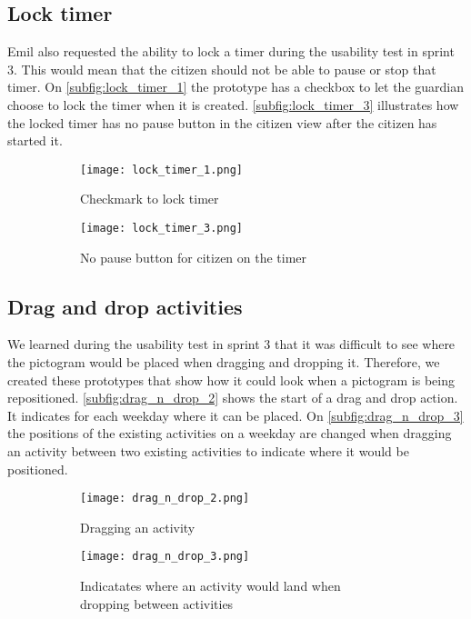 \subsection{Lock timer}
Emil also requested the ability to lock a timer during the usability test in sprint 3. 
This would mean that the citizen should not be able to pause or stop that timer.
On \autoref{subfig:lock_timer_1} the prototype has a checkbox to let the guardian choose to lock the timer when it is created.
\autoref{subfig:lock_timer_3} illustrates how the locked timer has no pause button in the citizen view after the citizen has started it. 
\begin{figure}[H]
    \begin{subfigure}{0.5\textwidth}
    \texttt{[image: lock\_timer\_1.png]}
    \caption{Checkmark to lock timer}
    \label{subfig:lock_timer_1}
    \end{subfigure}
    \begin{subfigure}{0.5\textwidth}
        \texttt{[image: lock\_timer\_3.png]}
    \caption{No pause button for citizen on the timer}
    \label{subfig:lock_timer_3}
    \end{subfigure} 
    \caption{}
    \label{fig:lock_timer}
\end{figure}

\subsection{Drag and drop activities}
We learned during the usability test in sprint 3 that it was difficult to see where the pictogram would be placed when dragging and dropping it.
Therefore, we created these prototypes that show how it could look when a pictogram is being repositioned.
\autoref{subfig:drag_n_drop_2} shows the start of a drag and drop action.
It indicates for each weekday where it can be placed. 
On \autoref{subfig:drag_n_drop_3} the positions of the existing activities on a weekday are changed when dragging an activity between two existing activities to indicate where it would be positioned.
\begin{figure}[H]
    \begin{subfigure}{0.5\textwidth}
    \texttt{[image: drag\_n\_drop\_2.png]}
    \caption{Dragging an activity}
    \label{subfig:drag_n_drop_2}
    \end{subfigure}
    \begin{subfigure}{0.5\textwidth}
        \texttt{[image: drag\_n\_drop\_3.png]}
    \caption{Indicatates where an activity would land when dropping between activities}
    \label{subfig:drag_n_drop_3}
    \end{subfigure} 
    \caption{}
    \label{fig:drag_n_drop}
\end{figure}

